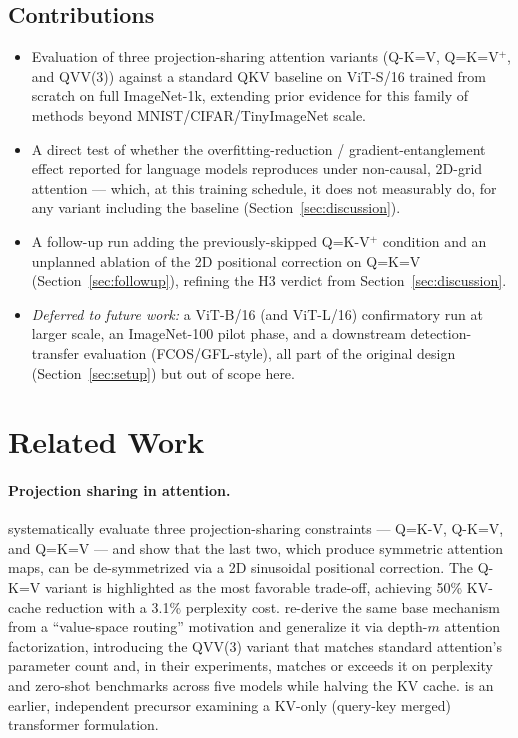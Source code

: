 \documentclass[11pt]{article}
\begin{document}
\subsection{Contributions}
\begin{itemize}
    \item Evaluation of three projection-sharing attention variants (Q-K=V,
    Q=K=V\(^+\), and QVV(3)) against a standard QKV baseline on ViT-S/16
    trained from scratch on full ImageNet-1k, extending prior evidence for
    this family of methods beyond MNIST/CIFAR/TinyImageNet scale.
    \item A direct test of whether the overfitting-reduction /
    gradient-entanglement effect reported for language models
    \citep{gao2026keyless} reproduces under non-causal, 2D-grid attention ---
    which, at this training schedule, it does not measurably do, for any
    variant including the baseline (Section~\ref{sec:discussion}).
    \item A follow-up run adding the previously-skipped Q=K-V\(^+\)
    condition and an unplanned ablation of the 2D positional correction on
    Q=K=V (Section~\ref{sec:followup}), refining the H3 verdict from
    Section~\ref{sec:discussion}.
    \item \emph{Deferred to future work:} a ViT-B/16 (and ViT-L/16)
    confirmatory run at larger scale, an ImageNet-100 pilot phase, and a
    downstream detection-transfer evaluation (FCOS/GFL-style), all part of
    the original design (Section~\ref{sec:setup}) but out of scope here.
\end{itemize}

\section{Related Work}
\label{sec:related}

\paragraph{Projection sharing in attention.}
\citet{kayyam2026three} systematically evaluate three projection-sharing
constraints --- Q=K-V, Q-K=V, and Q=K=V --- and show that the last two,
which produce symmetric attention maps, can be de-symmetrized via a 2D
sinusoidal positional correction. The Q-K=V variant is highlighted as the
most favorable trade-off, achieving 50\% KV-cache reduction with a 3.1\%
perplexity cost. \citet{gao2026keyless} re-derive the same base mechanism
from a ``value-space routing'' motivation and generalize it via depth-\(m\)
attention factorization, introducing the QVV(3) variant that matches
standard attention's parameter count and, in their experiments, matches or
exceeds it on perplexity and zero-shot benchmarks across five models while
halving the KV cache. \citet{borji2023kv} is an earlier, independent
precursor examining a KV-only (query-key merged) transformer formulation.
\end{document}
